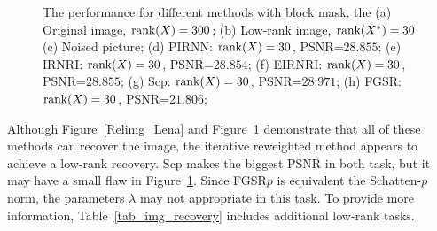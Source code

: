 \documentclass[twoside,11pt]{article}
\numberwithin{equation}{section}
\begin{document}
\begin{figure}[htbp]
{    
  }
  \captionsetup{singlelinecheck=off, justification=raggedright}
  \caption{The performance for different methods with block mask, the 
  (a) Original image, ${\rm rank}(X) = 300$; 
  (b) Low-rank image, ${\rm rank}(X^{*}) = 30$
  (c) Noised picture; 
  (d) PIRNN:  ${\rm rank}(X) = 30$,  PSNR=$28.855$;
  (e) IRNRI:  ${\rm rank}(X) = 30$,  PSNR=$28.854$;   
  (f) EIRNRI: ${\rm rank}(X) = 30$,  PSNR=$28.855$;    
  (g) Scp:    ${\rm rank}(X) = 30$,  PSNR=$28.971$;   
  (h) FGSR:   ${\rm rank}(X) = 30$,  PSNR=$21.806$;   
  }
  \label{Relimg_R1}
\end{figure}

Although Figure~\ref{Relimg_Lena} and Figure~\ref{Relimg_R1} demonstrate that all of these methods can recover the image, the iterative reweighted method appears to achieve a low-rank recovery. Scp makes the biggest PSNR in both task, but it may have a small flaw in Figure~\ref{Relimg_R1}. Since FGSR$p$ is equivalent the Schatten-$p$ norm, the parameters $\lambda$ may not appropriate in this task.
To provide more information, Table~\ref{tab_img_recovery} includes additional low-rank tasks.
\end{document}
